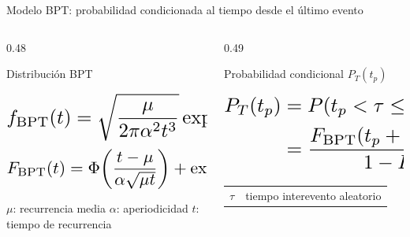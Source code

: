 \documentclass[aspectratio=169,10pt]{beamer}
\begin{document}
\begingroup
{}
\begin{frame}[t]{Modelo BPT: probabilidad condicionada al tiempo desde el último evento}
\fontsize{7.05}{7.65}\selectfont
\setlength{\abovedisplayskip}{0.18em}
\setlength{\belowdisplayskip}{0.18em}
\setlength{\jot}{0.08em}
\begin{columns}[T,onlytextwidth]
  \begin{column}{0.48\textwidth}
    \begin{block}{Distribución BPT}
    \begin{minipage}[t][0.265\textheight][t]{\linewidth}
    \[
      \resizebox{0.82\linewidth}{!}{$\displaystyle
      f_{\mathrm{BPT}}(t)=
      \sqrt{\frac{\mu}{2\pi \alpha^2 t^3}}
      \exp\!\left[-\frac{(t-\mu)^2}{2\mu \alpha^2 t}\right]$}
    \]
    \vspace{-0.10em}
    \[
      \resizebox{0.94\linewidth}{!}{$\displaystyle
      F_{\mathrm{BPT}}(t)=
      \Phi\!\left(\frac{t-\mu}{\alpha \sqrt{\mu t}}\right)
      + \exp\!\left(\frac{2}{\alpha^2}\right)
      \Phi\!\left(-\,\frac{t+\mu}{\alpha \sqrt{\mu t}}\right)$}
    \]
    \vspace{-0.25em}
    {\centering
      \fontsize{6.75}{7.2}\selectfont
      \(\mu\): recurrencia media \quad
      \(\alpha\): aperiodicidad \quad
      \(t\): tiempo de recurrencia\par}
    \end{minipage}
    \end{block}
  \end{column}
  \begin{column}{0.49\textwidth}
    \begin{block}{Probabilidad condicional \(P_T(t_p)\)}
    \begin{minipage}[t][0.265\textheight][t]{\linewidth}
    \[
      \resizebox{0.84\linewidth}{!}{$\displaystyle
      \begin{aligned}
      P_T(t_p)
      &= P\!\left(t_p < \tau \leq t_p+T \mid \tau>t_p\right)\\
      &= \frac{
      F_{\mathrm{BPT}}(t_p+T)-F_{\mathrm{BPT}}(t_p)}
      {1-F_{\mathrm{BPT}}(t_p)}
      \end{aligned}
      $}
    \]
    \vspace{-0.16em}
    {\centering
    \fontsize{6.95}{7.45}\selectfont
    \begin{tabular}{@{}>{$}r<{$}@{\,: }l@{}}
      \tau & tiempo interevento aleatorio\\

\end{tabular}}
\end{minipage}
\end{block}
\end{column}
\end{columns}
\end{frame}
\end{document}
